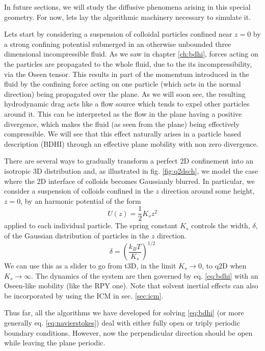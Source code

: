 \documentclass[ twoside,openright,titlepage,numbers=noenddot,%
headinclude,footinclude,cleardoublepage=empty,abstract=on,
BCOR=5mm,paper=a4,fontsize=11pt, dvipsnames
]{scrreprt}
\newcommand{\kT}{k_B T}
\newcommand{\half}{\frac{1}{2}}
\begin{document}
In future sections, we will study the diffusive phenomena arising in this special geometry. For now, lets lay the algorithmic machinery necessary to simulate it.

Lets start by considering a suspension of colloidal particles confined near $z=0$ by a strong confining potential submerged in an otherwise unbounded three dimensional incompressible fluid. As we saw in chapter \ref{ch:bdhi}, forces acting on the particles are propagated to the whole fluid, due to the its incompressibility, via the Oseen tensor. This results in part of the momemtum introduced in the fluid by the confining force acting on one particle (which acts in the normal direction) being propagated over the plane. As we will soon see, the resulting hydrodynamic drag acts like a flow source which tends to expel other particles around it. This can be interpreted as the flow in the plane having a positive divergence, which makes the fluid (as seen from the plane) being effectively compressible. We will see that this effect naturally arises in a particle based description (\gls{BDHI}) through an effective plane mobility with non zero divergence\cite{Pelaez2017}.

There are several ways to gradually transform a perfect 2D confinement into an isotropic 3D distribution and, as illustrated in fig. \ref{fig:q2dsch}, we model the case where the 2D interface of colloids becomes Gaussianly blurred. In particular, we consider a suspension of colloids confined in the $z$ direction around some height, $z=0$, by an harmonic potential of the form
\begin{equation}
U(z)=\half K_sz^2
\end{equation}
applied to each individual particle.
The spring constant $K_s$ controls the width, $\delta$, of the Gaussian distribution of particles in the $z$ direction.
\begin{equation}
  \delta = \left(\frac{\kT}{K_s}\right)^{1/2}
\end{equation}
We can use this as a slider to go from t3D, in the limit $K_s\rightarrow 0$, to q2D when $K_s\rightarrow\infty$.
The dynamics of the system are then governed by eq. \eqref{eq:bdhi} with an Oseen-like mobility (like the \gls{RPY} one). Note that solvent inertial effects can also be incorporated by using the \gls{ICM} in sec. \ref{sec:icm}.

Thus far, all the algorithms we have developed for solving \eqref{eq:bdhi} (or more generally eq. \eqref{eq:navierstokes}) deal with either fully open or triply periodic boundary conditions. However, now the perpendicular direction should be open while leaving the plane periodic.
\end{document}
